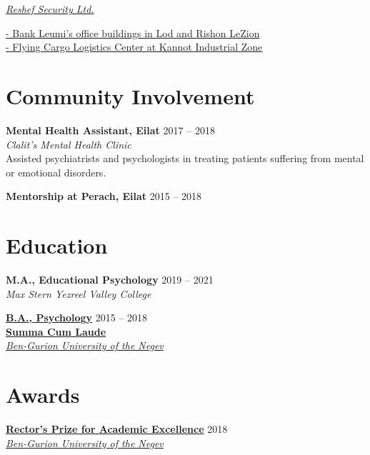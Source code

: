 \documentclass[
	12pt,a4paper %
]{article}
\begin{document}
\begin{paracol}{2}
\href{https://loona-il.000webhostapp.com/resume-references/recommendation-letter-security-guard.jpg}{\large \textit{Reshef Security Ltd.}}

\href{https://loona-il.000webhostapp.com/resume-references/recommendation-letter-security-guard.jpg}{- Bank Leumi's office buildings in Lod and Rishon LeZion\\
- Flying Cargo Logistics Center at Kannot Industrial Zone}

\section{Community Involvement}

\textbf{Mental Health Assistant, Eilat} \hfill 2017 -- 2018 \\
\textit{Clalit's Mental Health Clinic} \\
Assisted psychiatrists and psychologists in treating patients suffering from mental or emotional disorders.

\textbf{Mentorship at Perach, Eilat} \hfill 2015 -- 2018

\switchcolumn %

\section{Education}

\textbf{M.A., Educational Psychology} \hfill 2019 -- 2021 \\
\textit{Max Stern Yezreel Valley College}

\textbf{\href{https://loona-il.000webhostapp.com/resume-references/BA-and-honorary.pdf}{B.A., Psychology}} \hfill 2015 -- 2018 \\
\textbf{\href{https://loona-il.000webhostapp.com/resume-references/BA-and-honorary.pdf}{Summa Cum Laude}} \\
\textit{\href{https://loona-il.000webhostapp.com/resume-references/BA-and-honorary.pdf}{Ben-Gurion University of the Negev}}

\section{Awards}

\textbf{\href{https://loona-il.000webhostapp.com/resume-references/BA-and-honorary.pdf}{Rector’s Prize for Academic Excellence}} \hfill 2018 \\
\textit{\href{https://loona-il.000webhostapp.com/resume-references/BA-and-honorary.pdf}{Ben-Gurion University of the Negev}}


\end{paracol}
\end{document}
